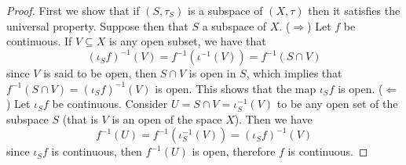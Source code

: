 \begin{proof}
    First we show that if \((S, \tau_S)\) is a subspace of \((X, \tau)\) then
    it satisfies the universal property. Suppose then that \(S\) a subspace of
    \(X\). (\(\Rightarrow\)) Let \(f\) be continuous. If \(V \subseteq X\) is any open subset, we have
    that
    \[
        (\iota_S  f)^{-1}(V) = f^{-1}(\iota^{-1}(V)) = f^{-1}(S \cap V)
    \]
    since \(V\) is said to be open, then \(S \cap V\) is open in \(S\), which
    implies that \(f^{-1}(S \cap V) = (\iota_S  f)^{-1}(V)\) is open. This
    shows that the map \(\iota_S  f\) is open. (\(\Leftarrow\)) Let \(\iota_S
    f\) be continuous. Consider \(U = S \cap V = \iota_S^{-1}(V)\) to be any
    open set of the subspace \(S\) (that is \(V\) is an open of the space \(X\)).
    Then we have
    \[
        f^{-1}(U) = f^{-1}(\iota_S^{-1}(V)) = (\iota_S  f)^{-1}(V)
    \]
    since \(\iota_S  f\) is continuous, then \(f^{-1}(U)\) is open, therefore
    \(f\) is continuous.


\end{proof}

